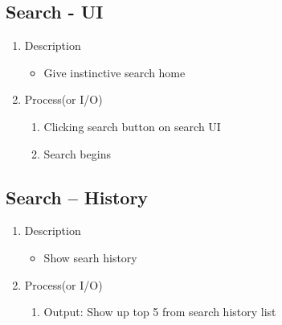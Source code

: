 \documentclass[conference]{IEEEtran}
\begin{document}
\begin{itemize}
\begin{itemize}
\begin{itemize}
\begin{itemize}
\subsection{Search - UI}
\begin{enumerate}
\item Description
\begin{itemize}
   \item Give instinctive search home
\end{itemize}
\item Process(or I/O)
  \begin{enumerate}
     \item Clicking search button on search UI
     \item Search begins
  \end{enumerate}
\end{enumerate}
\textit{}

\subsection{Search – History}
\begin{enumerate}
\item Description
\begin{itemize}
   \item Show searh history
\end{itemize}
\item Process(or I/O)
  \begin{enumerate}
     \item Output: Show up top 5 from search history list
  \end{enumerate}
\end{enumerate}
\textit{}


\end{itemize}
\end{itemize}
\end{itemize}
\end{itemize}
\end{document}

